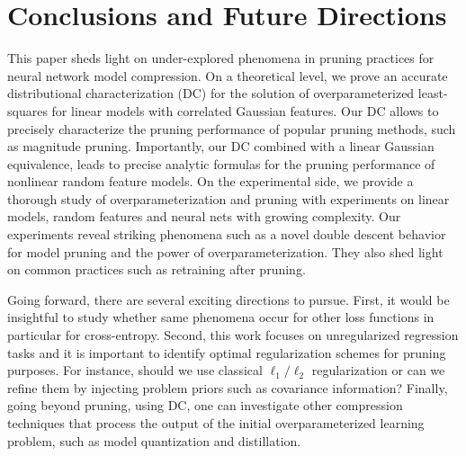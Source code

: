 
\section{Conclusions and Future Directions}\label{sec discuss}
This paper sheds light on under-explored phenomena in pruning practices for neural network model compression. On a theoretical level, we prove an accurate distributional characterization (DC) for the solution of overparameterized least-squares for linear models with correlated Gaussian features. Our DC allows to precisely characterize the pruning performance of popular pruning methods, such as magnitude pruning. Importantly, our DC combined with a linear Gaussian equivalence, leads to precise analytic formulas for the pruning performance of nonlinear random feature models. On the experimental side, we provide a thorough study of overparameterization and pruning with experiments on linear models, random features and neural nets with growing complexity. Our experiments reveal striking phenomena such as a novel double descent behavior for model pruning and the power of overparameterization. They also shed light on common practices such as retraining after pruning. 

Going forward, there are several exciting directions to pursue. First, it would be insightful to study whether same phenomena occur for other loss functions in particular for cross-entropy. Second, this work focuses on unregularized regression tasks and it is important to identify optimal regularization schemes for pruning purposes. For instance, should we use classical $\ell_1/\ell_2$ regularization or can we refine them by injecting problem priors such as covariance information? Finally, going beyond pruning, using DC, one can investigate other compression techniques that process the output of the initial overparameterized learning problem, such as model quantization and distillation. 